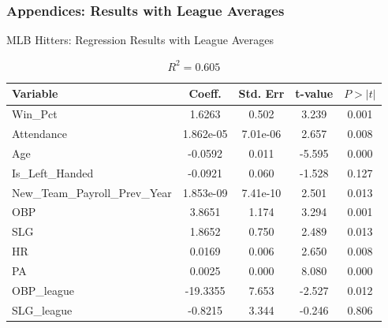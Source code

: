 \documentclass[9pt]{beamer}
\begin{document}
\begin{frame}
    \frametitle{Appendices: Results with League Averages} 
    \begin{block}{MLB Hitters: Regression Results with League Averages}
        \begin{table}[ht]
            \centering
            \caption{$R^2 = 0.605$}
            \begin{tabular}{lcccc}
            \toprule
            Variable & Coeff. & Std. Err & t-value & $P > |t|$ \\
            \midrule
            \rowcolor{red!20} Win\_Pct & 1.6263 & 0.502 & 3.239 & 0.001 \\
            \rowcolor{red!20} Attendance & 1.862e-05 & 7.01e-06 & 2.657 & 0.008 \\
            \rowcolor{red!20} Age & -0.0592 & 0.011 & -5.595 & 0.000 \\
            Is\_Left\_Handed & -0.0921 & 0.060 & -1.528 & 0.127 \\
            \rowcolor{red!20} New\_Team\_Payroll\_Prev\_Year & 1.853e-09 & 7.41e-10 & 2.501 & 0.013 \\
            \rowcolor{red!20} OBP & 3.8651 & 1.174 & 3.294 & 0.001 \\
            \rowcolor{red!20} SLG & 1.8652 & 0.750 & 2.489 & 0.013 \\
            \rowcolor{red!20} HR & 0.0169 & 0.006 & 2.650 & 0.008 \\
            \rowcolor{red!20} PA & 0.0025 & 0.000 & 8.080 & 0.000 \\
            \rowcolor{red!20} OBP\_league & -19.3355 & 7.653 & -2.527 & 0.012 \\
            SLG\_league & -0.8215 & 3.344 & -0.246 & 0.806 \\
            \bottomrule
            \end{tabular}
        \end{table}
        
    \end{block}
\end{frame}
\end{document}
